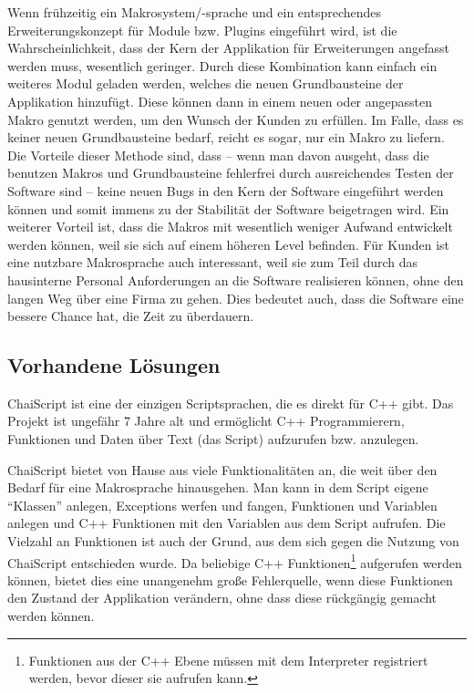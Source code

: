     Wenn frühzeitig ein Makrosystem/-sprache und ein entsprechendes Erweiterungskonzept für Module bzw. Plugins eingeführt wird, ist die Wahrscheinlichkeit, dass der Kern der Applikation für Erweiterungen angefasst werden muss, wesentlich geringer. Durch diese Kombination kann einfach ein weiteres Modul geladen werden, welches die neuen Grundbausteine der Applikation hinzufügt. Diese können dann in einem neuen oder angepassten Makro genutzt werden, um den Wunsch der Kunden zu erfüllen. Im Falle, dass es keiner neuen Grundbausteine bedarf, reicht es sogar, nur ein Makro zu liefern. Die Vorteile dieser Methode sind, dass -- wenn man davon ausgeht, dass die benutzen Makros und Grundbausteine fehlerfrei durch ausreichendes Testen der Software sind -- keine neuen Bugs in den Kern der Software eingeführt werden können und somit immens zu der Stabilität der Software beigetragen wird. Ein weiterer Vorteil ist, dass die Makros mit wesentlich weniger Aufwand entwickelt werden können, weil sie sich auf einem höheren Level befinden. Für Kunden ist eine nutzbare Makrosprache auch interessant, weil sie zum Teil durch das hausinterne Personal Anforderungen an die Software realisieren können, ohne den langen Weg über eine Firma zu gehen. Dies bedeutet auch, dass die Software eine bessere Chance hat, die Zeit zu überdauern.

  \subsection{Vorhandene Lösungen}
  \label{ssec:Vorhandene Lösungen}
    ChaiScript \autocite{chai-script} ist eine der einzigen Scriptsprachen, die es direkt für C++ gibt. Das Projekt ist ungefähr 7 Jahre alt und ermöglicht C++ Programmierern, Funktionen und Daten über Text (das Script) aufzurufen bzw. anzulegen.

    ChaiScript bietet von Hause aus viele Funktionalitäten an, die weit über den Bedarf für eine Makrosprache hinausgehen. Man kann in dem Script eigene ``Klassen'' anlegen, Exceptions werfen und fangen, Funktionen und Variablen anlegen und C++ Funktionen mit den Variablen aus dem Script aufrufen. Die Vielzahl an Funktionen ist auch der Grund, aus dem sich gegen die Nutzung von ChaiScript entschieden wurde. Da beliebige C++ Funktionen\footnote{
      Funktionen aus der C++ Ebene müssen mit dem Interpreter registriert werden, bevor dieser sie aufrufen kann.
    } aufgerufen werden können, bietet dies eine unangenehm große Fehlerquelle, wenn diese Funktionen den Zustand der Applikation verändern, ohne dass diese rückgängig gemacht werden können.

